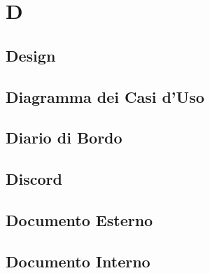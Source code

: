 \section{D} 
\subsection{Design} 

\subsection{Diagramma dei Casi d'Uso} 

\subsection{Diario di Bordo} 

\subsection{Discord} 

\subsection{Documento Esterno} 

\subsection{Documento Interno} 

